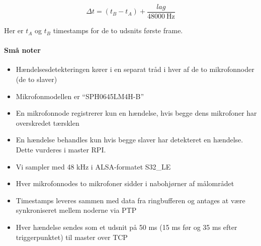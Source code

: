 \documentclass[
  danish,
]{article}
\begin{document}
\[\Delta t = (t_{B} - t_{A}) + \frac{\mathit{lag}}{48000\ \mathrm{Hz}}\]

Her er \(t_{A}\) og \(t_{B}\) timestamps for de to udsnits første frame.

\paragraph{Små noter}

\begin{itemize}
\item
  Hændelsesdetekteringen kører i en separat tråd i hver af de to
  mikrofonnoder (de to slaver)
\item
  Mikrofonmodellen er ``SPH0645LM4H-B''
\item
  En mikrofonnode registrerer kun en hændelse, hvis begge dens
  mikrofoner har overskredet tærsklen
\item
  En hændelse behandles kun hvis begge slaver har detekteret en
  hændelse. Dette vurderes i master RPI.
\item
  Vi sampler med 48 kHz i ALSA-formatet S32\_LE
\item
  Hver mikrofonnodes to mikrofoner sidder i nabohjørner af målområdet
\item
  Timestamps leveres sammen med data fra ringbufferen og antages at være
  synkroniseret mellem noderne via PTP
\item
  Hver hændelse sendes som et udsnit på 50 ms (15 ms før og 35 ms efter
  triggerpunktet) til master over TCP
\end{itemize}
\end{document}
